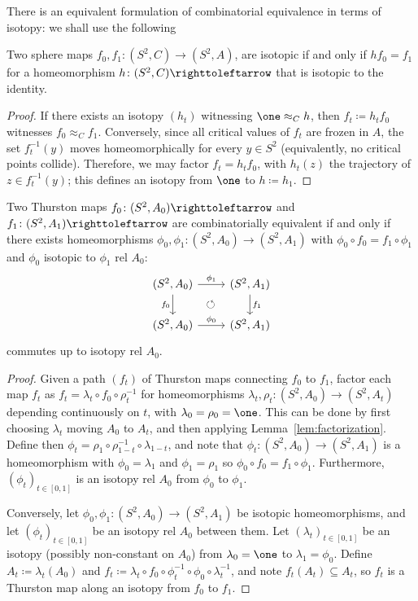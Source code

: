 \documentclass{amsart}
\begin{document}
\noindent There is an equivalent formulation of combinatorial
equivalence in terms of isotopy: we shall use the following
\begin{lem}\label{lem:factorization}
  Two sphere maps $f_0,f_1\colon(S^2,C)\to(S^2,A)$, are isotopic if
  and only if $h f_0=f_1$ for a homeomorphism $h\colon(S^2,C)\selfmap$
  that is isotopic to the identity.
\end{lem}
\begin{proof}
  If there exists an isotopy $(h_t)$ witnessing $\one\approx_C h$, then
  $f_t\coloneqq h_t f_0$ witnesses $f_0\approx_C f_1$. Conversely,
  since all critical values of $f_t$ are frozen in $A$, the set
  $f_t^{-1}(y)$ moves homeomorphically for every $y\in S^2$
  (equivalently, no critical points collide). Therefore, we may factor
  $f_t = h_t f_0$, with $h_t(z)$ the trajectory of $z\in f_t^{-1}(y)$;
  this defines an isotopy from $\one$ to $h\coloneqq h_1$.
\end{proof}

\begin{lem}\label{lem:combinatorial equivalence}
  Two Thurston maps $f_0\colon(S^2,A_0)\selfmap$ and
  $f_1\colon(S^2,A_1)\selfmap$ are combinatorially equivalent if and
  only if there exists homeomorphisms
  $\phi_0,\phi_1\colon(S^2,A_0)\to(S^2,A_1)$ with
  $\phi_0\circ f_0=f_1\circ\phi_1$ and $\phi_0$ isotopic to $\phi_1$
  rel $A_0$:
  \[\begin{tikzcd}
      (S^2,A_0)\ar[r,"\phi_1"]\ar[d,"f_0" left]\ar[dr,phantom,"\circlearrowleft"] & (S^2,A_1)\ar[d,"f_1"]\\
      (S^2,A_0)\ar[r,"\phi_0"] & (S^2,A_1)
    \end{tikzcd}\]
  commutes up to isotopy rel $A_0$.
\end{lem}
\begin{proof}
  Given a path $(f_t)$ of Thurston maps connecting $f_0$ to $f_1$,
  factor each map $f_t$ as $f_t=\lambda_t\circ f_0\circ\rho_t^{-1}$
  for homeomorphisms $\lambda_t,\rho_t\colon(S^2,A_0)\to(S^2,A_t)$
  depending continuously on $t$, with $\lambda_0=\rho_0=\one$. This
  can be done by first choosing $\lambda_t$ moving $A_0$ to $A_t$, and
  then applying Lemma~\ref{lem:factorization}.  Define then
  $\phi_t=\rho_1\circ\rho_{1-t}^{-1}\circ\lambda_{1-t}$, and note that
  $\phi_t\colon(S^2,A_0)\to(S^2,A_1)$ is a homeomorphism with
  $\phi_0=\lambda_1$ and $\phi_1=\rho_1$ so
  $\phi_0\circ f_0=f_1\circ\phi_1$. Furthermore,
  $(\phi_t)_{t\in[0,1]}$ is an isotopy rel $A_0$ from $\phi_0$ to
  $\phi_1$.

  Conversely, let $\phi_0,\phi_1\colon(S^2,A_0)\to(S^2,A_1)$ be
  isotopic homeomorphisms, and let $(\phi_t)_{t\in[0,1]}$ be an
  isotopy rel $A_0$ between them. Let $(\lambda_t)_{t\in[0,1]}$ be an
  isotopy (possibly non-constant on $A_0$) from $\lambda_0=\one$ to
  $\lambda_1=\phi_0$.  Define $A_t\coloneqq\lambda_t(A_0)$ and
  $f_t\coloneqq\lambda_t\circ
  f_0\circ\phi_t^{-1}\circ\phi_0\circ\lambda_t^{-1}$, and note
  $f_t(A_t)\subseteq A_t$, so $f_t$ is a Thurston map along an isotopy
  from $f_0$ to $f_1$.
\end{proof}
\end{document}
